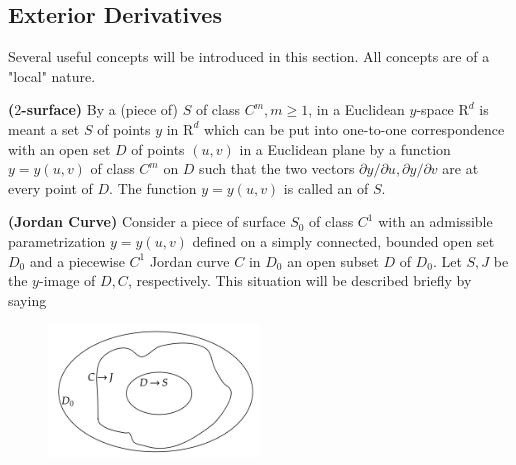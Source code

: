 \documentclass{article}
\newcommand{\bfs}[1]{\textbf{({#1}) }}
\begin{document}
\subsection{Exterior Derivatives}
Several useful concepts will be introduced in this section. All concepts are of a "local" nature.
\begin{defa}\bfs{$2$-surface}
By a (piece of)  $S$ of class $C^{m}, m \geq 1$, in a Euclidean $y$-space $\mathrm{R}^{d}$ is meant a set $S$ of points $y$ in $\mathrm{R}^{d}$ which can be put into one-to-one correspondence with an open set $D$ of points $(u, v)$ in a Euclidean plane by a function $y=y(u, v)$ of class $C^{m}$ on $D$ such that the two vectors $\partial y / \partial u, \partial y / \partial v$ are  at every point of $D$. The function $y=y(u, v)$ is called an  of $S$.
\end{defa}

\begin{defa}\bfs{Jordan Curve}
Consider a piece of surface $S_{0}$ of class $C^{1}$ with an admissible parametrization $y=y(u, v)$ defined on a simply connected, bounded open set $D_{0}$ and a piecewise $C^{1}$ Jordan curve $C$ in $D_{0}$  an open subset $D$ of $D_{0}$. Let $S, J$ be the $y$-image of $D, C$, respectively. This situation will be described briefly by saying 
\end{defa}

\begin{figure}[H]
    \centering
    \includegraphics[width=0.5\textwidth]{Figs/13.png}
\end{figure}
\end{document}
